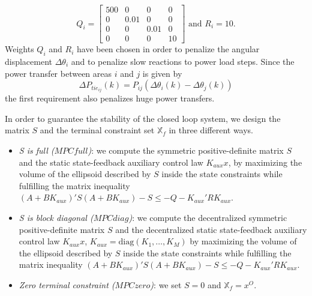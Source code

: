 \documentclass[a4paper]{article}
\newcommand{\diag}{\mbox{diag}}
\newcommand{\Xset}{\mathbb{X}}
\newcommand{\matr}[1]{
\begin{bmatrix}
    #1
\end{bmatrix}
}
\begin{document}
          $$
          Q_i = \matr{ 500 & 0 & 0 & 0 \\ 0 & 0.01 & 0 & 0 \\ 0 & 0 & 0.01 & 0 \\ 0 & 0 & 0 & 10 }\mbox{    and    } R_i = 10.
          $$
          Weights $Q_i$ and $R_i$ have been chosen in order to penalize the angular displacement $\Delta\theta_i$ and to penalize slow reactions to power load steps. Since the power transfer between areas $i$ and $j$ is given by
          \begin{equation}
            \label{eq:powerexchanged}
            \Delta P_{{tie}_{ij}}(k) = P_{ij}(\Delta\theta_i(k)-\Delta\theta_j(k))
          \end{equation}
          the first requirement also penalizes huge power transfers.

          In order to guarantee the stability of the closed loop system, we design the matrix $S$ and the terminal constraint set $\Xset_f$ in three different ways.
          \begin{itemize}
          \item\emph{S is full ($MPCfull$)}: we compute the symmetric positive-definite matrix $S$ and the static state-feedback auxiliary control law $K_{aux}x$, by maximizing the volume of the ellipsoid described by $S$ inside the state constraints while fulfilling the matrix inequality $(A+BK_{aux})'S(A+BK_{aux})-S\leq-Q-K_{aux}'RK_{aux}$.
          \item\emph{S is block diagonal ($MPCdiag$)}: we compute the decentralized symmetric positive-definite matrix $S$ and the decentralized static state-feedback auxiliary control law $K_{aux}x$, $K_{aux}=\diag(K_{1},\ldots,K_{M})$ by maximizing the volume of the ellipsoid described by $S$ inside the state constraints while fulfilling the matrix inequality $(A+BK_{aux})'S(A+BK_{aux})-S\leq-Q-K_{aux}'RK_{aux}$.
          \item\emph{Zero terminal constraint ($MPCzero$)}: we set $S=0$ and $\Xset_f = x^O$. 
          \end{itemize}
          
\end{document}
